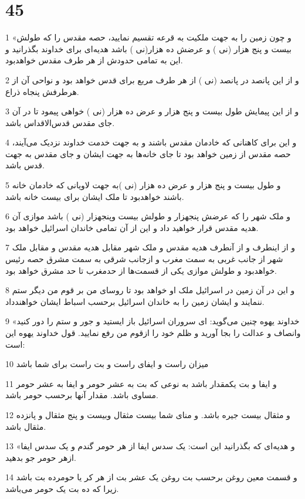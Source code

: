 \chapter{45}

\par 1 «و چون زمین را به جهت ملکیت به قرعه تقسیم نمایید، حصه مقدس را که طولش بیست و پنج هزار (نی ) و عرضش ده هزار(نی ) باشد هدیه‌ای برای خداوند بگذرانید و این به تمامی حدودش از هر طرف مقدس خواهدبود.
\par 2 و از این پانصد در پانصد (نی ) از هر طرف مربع برای قدس خواهد بود و نواحی آن از هرطرفش پنجاه ذراع.
\par 3 و از این پیمایش طول بیست و پنج هزار و عرض ده هزار (نی ) خواهی پیمود تا در آن جای مقدس قدس‌الاقداس باشد.
\par 4 و این برای کاهنانی که خادمان مقدس باشند و به جهت خدمت خداوند نزدیک می‌آیند، حصه مقدس از زمین خواهد بود تا جای خانه‌ها به جهت ایشان و جای مقدس به جهت قدس باشد.
\par 5 و طول بیست و پنج هزار و عرض ده هزار (نی )به جهت لاویانی که خادمان خانه باشند خواهدبود تا ملک ایشان برای بیست خانه باشد.
\par 6 و ملک شهر را که عرضش پنجهزار و طولش بیست وپنجهزار (نی ) باشد موازی آن هدیه مقدس قرار خواهید داد و این از آن تمامی خاندان اسرائیل خواهد بود.
\par 7 و از اینطرف و از آنطرف هدیه مقدس و ملک شهر مقابل هدیه مقدس و مقابل ملک شهر از جانب غربی به سمت مغرب و ازجانب شرقی به سمت مشرق حصه رئیس خواهدبود و طولش موازی یکی از قسمت‌ها از حدمغرب تا حد مشرق خواهد بود.
\par 8 و این در آن زمین در اسرائیل ملک او خواهد بود تا روسای من بر قوم من دیگر ستم ننمایند و ایشان زمین را به خاندان اسرائیل بر‌حسب اسباط ایشان خواهندداد.
\par 9 «خداوند یهوه چنین می‌گوید: ای سروران اسرائیل باز ایستید و جور و ستم را دور کنید وانصاف و عدالت را بجا آورید و ظلم خود را ازقوم من رفع نمایید. قول خداوند یهوه این است:
\par 10 میزان راست و ایفای راست و بت راست برای شما باشد
\par 11 و ایفا و بت یکمقدار باشد به نوعی که بت به عشر حومر و ایفا به عشر حومر مساوی باشد. مقدار آنها بر‌حسب حومر باشد.
\par 12 و مثقال بیست جیره باشد. و منای شما بیست مثقال وبیست و پنج مثقال و پانزده مثقال باشد.
\par 13 «و هدیه‌ای که بگذرانید این است: یک سدس ایفا از هر حومر گندم و یک سدس ایفا ازهر حومر جو بدهید.
\par 14 و قسمت معین روغن برحسب بت روغن یک عشر بت از هر کر یا حومرده بت باشد زیرا که ده بت یک حومر می‌باشد.
